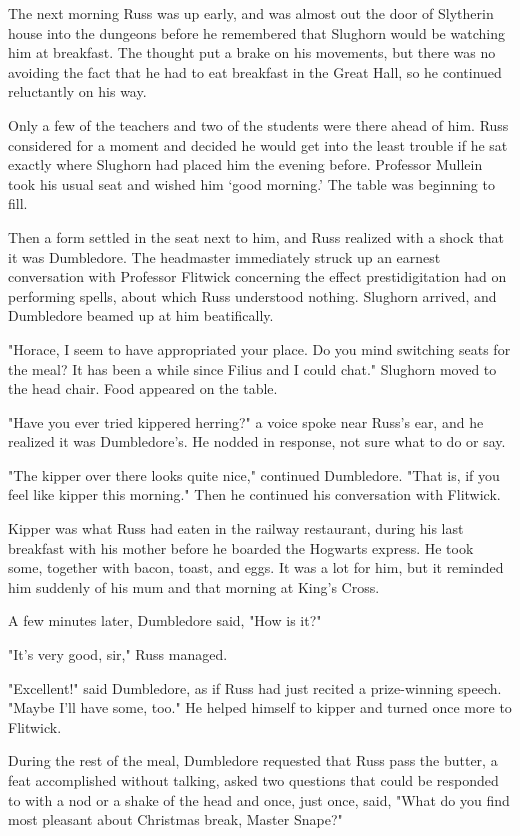 The next morning Russ was up early, and was almost out the door of Slytherin house into the dungeons before he remembered that Slughorn would be watching him at breakfast. The thought put a brake on his movements, but there was no avoiding the fact that he had to eat breakfast in the Great Hall, so he continued reluctantly on his way.

Only a few of the teachers and two of the students were there ahead of him. Russ considered for a moment and decided he would get into the least trouble if he sat exactly where Slughorn had placed him the evening before. Professor Mullein took his usual seat and wished him `good morning.' The table was beginning to fill.

Then a form settled in the seat next to him, and Russ realized with a shock that it was Dumbledore. The headmaster immediately struck up an earnest conversation with Professor Flitwick concerning the effect prestidigitation had on performing spells, about which Russ understood nothing. Slughorn arrived, and Dumbledore beamed up at him beatifically.

"Horace, I seem to have appropriated your place. Do you mind switching seats for the meal? It has been a while since Filius and I could chat." Slughorn moved to the head chair. Food appeared on the table.

"Have you ever tried kippered herring?" a voice spoke near Russ's ear, and he realized it was Dumbledore's. He nodded in response, not sure what to do or say.

"The kipper over there looks quite nice," continued Dumbledore. "That is, if you feel like kipper this morning." Then he continued his conversation with Flitwick.

Kipper was what Russ had eaten in the railway restaurant, during his last breakfast with his mother before he boarded the Hogwarts express. He took some, together with bacon, toast, and eggs. It was a lot for him, but it reminded him suddenly of his mum and that morning at King's Cross.

A few minutes later, Dumbledore said, "How is it?"

"It's very{\el} good, sir," Russ managed.

"Excellent!" said Dumbledore, as if Russ had just recited a prize-winning speech. "Maybe I'll have some, too." He helped himself to kipper and turned once more to Flitwick.

During the rest of the meal, Dumbledore requested that Russ pass the butter, a feat accomplished without talking, asked two questions that could be responded to with a nod or a shake of the head and once, just once, said, "What do you find most pleasant about Christmas break, Master Snape?"

